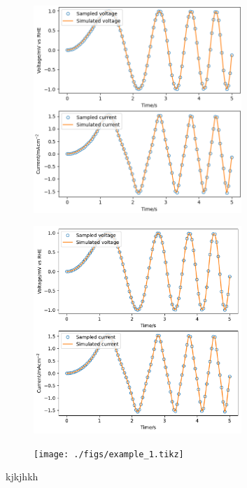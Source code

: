 


    \begin{figure}
        \includegraphics[width=0.7\textwidth]{./figs/example_1.png}
    \end{figure}

    \begin{figure}
        \includegraphics[width=0.7\textwidth]{./figs/example_1.pdf}
    \end{figure}

    \begin{figure}
        \texttt{[image: ./figs/example\_1.tikz]}
    \end{figure}  
       
kjkjhkh
